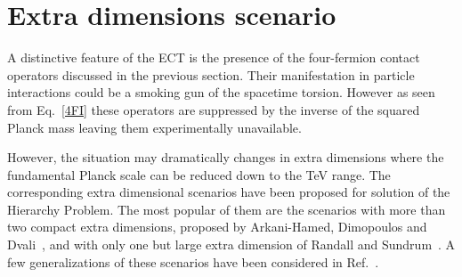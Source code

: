 \documentclass[twocolumn,showpacs,showkeys,prd,superscriptaddress]{revtex4-1}
\begin{document}
\section{\label{sec:extradim}Extra dimensions scenario}



A distinctive feature of the ECT is the presence of the four-fermion contact operators discussed in the previous section.  Their manifestation in particle interactions  could be a smoking gun of the spacetime torsion. However as seen from Eq.~\eqref{4FI} these operators are  suppressed  by the inverse of the squared Planck mass leaving them experimentally unavailable.

However, the situation may dramatically changes in extra dimensions where the fundamental Planck scale can be reduced down to the TeV range. The corresponding extra dimensional scenarios have been proposed for solution of the Hierarchy Problem. The most popular of them are the scenarios  with more than two compact extra dimensions, proposed by Arkani-Hamed, Dimopoulos and Dvali~\cite{ArkaniHamed:1998rs,Antoniadis:1998ig,ArkaniHamed:1998nn}, and with only one but large extra dimension of Randall and Sundrum~\cite{Randall:1999ee,Randall:1999vf}. A few generalizations of these scenarios have been considered in Ref.~\cite{DeWolfe:1999cp,Gremm:1999pj,MPS,CastilloFelisola:2004eg}.



%
%

\end{document}
